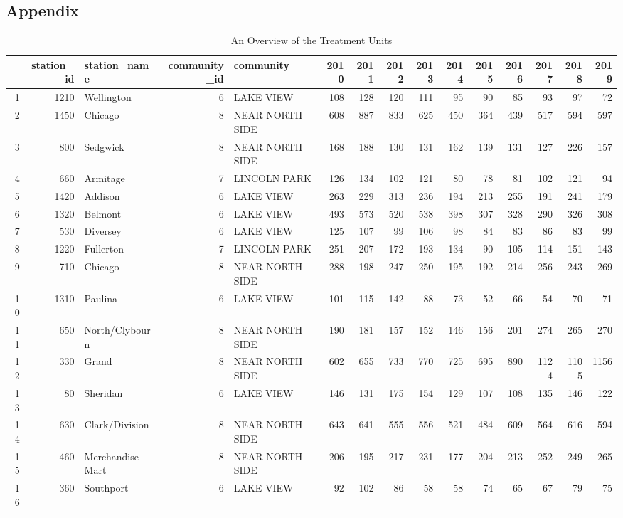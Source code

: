 \documentclass[a4paper, 11pt]{article}
\begin{document}
\begin{landscape}
\section*{Appendix}
\vspace{4em}
\begin{table}[ht]
\centering
  \caption{An Overview of the Treatment Units} 
  \label{tab:treatment} 
\begin{tabular}{rrlrlrrrrrrrrrr}
  \hline\hline
 & station\_id & station\_name & community\_id & community & 2010 & 2011 & 2012 & 2013 & 2014 & 2015 & 2016 & 2017 & 2018 & 2019 \\ 
  \hline
1 & 1210 & Wellington &   6 & LAKE VIEW & 108 & 128 & 120 & 111 &  95 &  90 &  85 &  93 &  97 &  72 \\ 
  2 & 1450 & Chicago &   8 & NEAR NORTH SIDE & 608 & 887 & 833 & 625 & 450 & 364 & 439 & 517 & 594 & 597 \\ 
  3 & 800 & Sedgwick &   8 & NEAR NORTH SIDE & 168 & 188 & 130 & 131 & 162 & 139 & 131 & 127 & 226 & 157 \\ 
  4 & 660 & Armitage &   7 & LINCOLN PARK & 126 & 134 & 102 & 121 &  80 &  78 &  81 & 102 & 121 &  94 \\ 
  5 & 1420 & Addison &   6 & LAKE VIEW & 263 & 229 & 313 & 236 & 194 & 213 & 255 & 191 & 241 & 179 \\ 
  6 & 1320 & Belmont &   6 & LAKE VIEW & 493 & 573 & 520 & 538 & 398 & 307 & 328 & 290 & 326 & 308 \\ 
  7 & 530 & Diversey &   6 & LAKE VIEW & 125 & 107 &  99 & 106 &  98 &  84 &  83 &  86 &  83 &  99 \\ 
  8 & 1220 & Fullerton &   7 & LINCOLN PARK & 251 & 207 & 172 & 193 & 134 &  90 & 105 & 114 & 151 & 143 \\ 
  9 & 710 & Chicago &   8 & NEAR NORTH SIDE & 288 & 198 & 247 & 250 & 195 & 192 & 214 & 256 & 243 & 269 \\ 
  10 & 1310 & Paulina &   6 & LAKE VIEW & 101 & 115 & 142 &  88 &  73 &  52 &  66 &  54 &  70 &  71 \\ 
  11 & 650 & North/Clybourn &   8 & NEAR NORTH SIDE & 190 & 181 & 157 & 152 & 146 & 156 & 201 & 274 & 265 & 270 \\ 
  12 & 330 & Grand &   8 & NEAR NORTH SIDE & 602 & 655 & 733 & 770 & 725 & 695 & 890 & 1124 & 1105 & 1156 \\ 
  13 &  80 & Sheridan &   6 & LAKE VIEW & 146 & 131 & 175 & 154 & 129 & 107 & 108 & 135 & 146 & 122 \\ 
  14 & 630 & Clark/Division &   8 & NEAR NORTH SIDE & 643 & 641 & 555 & 556 & 521 & 484 & 609 & 564 & 616 & 594 \\ 
  15 & 460 & Merchandise Mart &   8 & NEAR NORTH SIDE & 206 & 195 & 217 & 231 & 177 & 204 & 213 & 252 & 249 & 265 \\ 
  16 & 360 & Southport &   6 & LAKE VIEW &  92 & 102 &  86 &  58 &  58 &  74 &  65 &  67 &  79 &  75 \\ 
   \hline\hline
\end{tabular}
\end{table}


\end{landscape}
\end{document}
